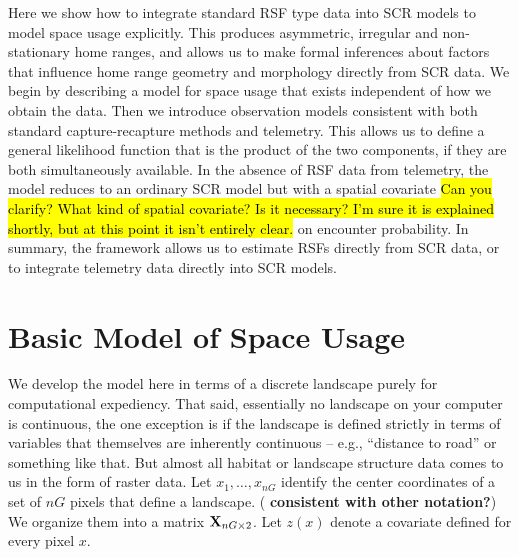 Here we show how to integrate standard RSF type data into SCR models
to model space usage explicitly. This produces asymmetric, irregular
and non-stationary home ranges, and allows us to make formal
inferences about factors that influence home range geometry and
morphology directly from SCR data.  We begin by describing a model for
space usage that exists independent of how we obtain the data. Then we
introduce observation models consistent with both standard
capture-recapture methods and telemetry.  This allows us to define a
general likelihood function that is the product of the two
components, if they are both simultaneously available.  In the absence
of RSF data from telemetry, the model reduces to an ordinary SCR model
but with a spatial covariate
\hl{ Can you clarify? What kind of spatial covariate? Is it necessary?
I'm sure it is explained shortly, but at this point it isn't entirely clear.}
on encounter probability.  In summary,
the framework allows us to estimate RSFs directly from SCR data, or to
integrate telemetry data directly into SCR models.

\section{Basic Model of Space Usage}
\label{rsf.sec.rsfmodel}

We develop the model here in terms of a discrete landscape purely for
computational expediency. That said, essentially no landscape on your
computer is continuous, the one exception is if the landscape is
defined strictly in terms of variables that themselves are inherently
continuous -- e.g., ``distance to road'' or something like that.  But
almost all habitat or landscape structure data comes to us in the form
of raster data.  Let $x_{1},\ldots,x_{nG}$ identify the center
coordinates of a set of $nG$ pixels that define a landscape. ({\bf
  consistent with other notation?}) We organize them into a matrix
${\bf X}_{nG \times 2}$.  Let $z(x)$ denote a covariate defined for
every pixel $x$.

